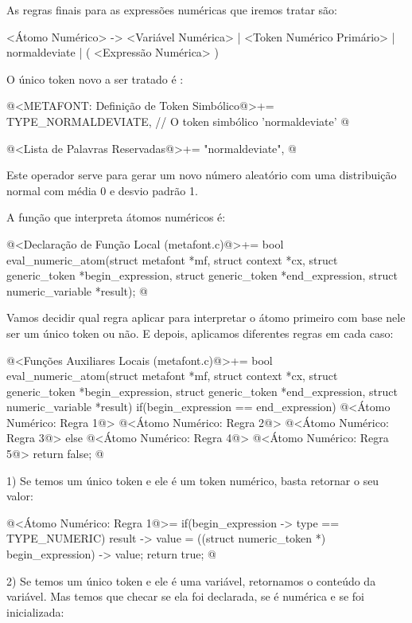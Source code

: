 
As regras finais para as expressões numéricas que iremos tratar são:

\alinhaverbatim
<Átomo Numérico> -> <Variável Numérica> |
                    <Token Numérico Primário> |
                    normaldeviate |
                    ( <Expressão Numérica> )
\alinhanormal

O único token novo a ser tratado é :

\iniciocodigo
@<METAFONT: Definição de Token Simbólico@>+=
TYPE_NORMALDEVIATE,  // O token simbólico 'normaldeviate'
@
\fimcodigo

\iniciocodigo
@<Lista de Palavras Reservadas@>+=
"normaldeviate",
@
\fimcodigo

Este operador serve para gerar um novo número aleatório com uma
distribuição normal com média 0 e desvio padrão 1.

A função que interpreta átomos numéricos é:

\iniciocodigo
@<Declaração de Função Local (metafont.c)@>+=
bool eval_numeric_atom(struct metafont *mf, struct context *cx,
                       struct generic_token *begin_expression,
                       struct generic_token *end_expression,
                       struct numeric_variable *result);
@
\fimcodigo

Vamos decidir qual regra aplicar para interpretar o átomo primeiro com
base nele ser um único token ou não. E depois, aplicamos diferentes
regras em cada caso:

\iniciocodigo
@<Funções Auxiliares Locais (metafont.c)@>+=
bool eval_numeric_atom(struct metafont *mf, struct context *cx,
                       struct generic_token *begin_expression,
                       struct generic_token *end_expression,
                       struct numeric_variable *result){
  if(begin_expression == end_expression){
    @<Átomo Numérico: Regra 1@>
    @<Átomo Numérico: Regra 2@>
    @<Átomo Numérico: Regra 3@>
  }
  else{
    @<Átomo Numérico: Regra 4@>
    @<Átomo Numérico: Regra 5@>
  }
  return false;
}
@

1) Se temos um único token e ele é um token numérico, basta retornar o
seu valor:

\iniciocodigo
@<Átomo Numérico: Regra 1@>=
if(begin_expression -> type == TYPE_NUMERIC){
  result -> value = ((struct numeric_token *) begin_expression) -> value;
  return true;
}
@
\fimcodigo

2) Se temos um único token e ele é uma variável, retornamos o conteúdo
da variável. Mas temos que checar se ela foi declarada, se é numérica
e se foi inicializada:

